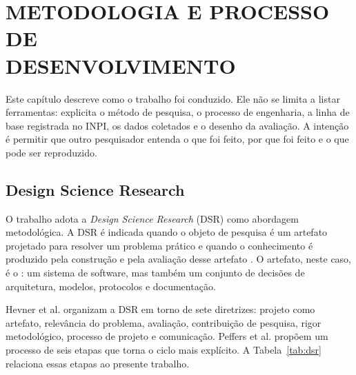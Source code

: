 
\chapter[METODOLOGIA E PROCESSO DE DESENVOLVIMENTO]{METODOLOGIA E PROCESSO DE\\DESENVOLVIMENTO}
\label{cap:metodologia}

Este capítulo descreve como o trabalho foi conduzido. Ele não se limita a
listar ferramentas: explicita o método de pesquisa, o processo de engenharia, a
linha de base registrada no INPI, os dados coletados e o desenho da avaliação.
A intenção é permitir que outro pesquisador entenda o que foi feito, por que foi
feito e o que pode ser reproduzido.

\section{Design Science Research}
\label{sec:dsr}

O trabalho adota a \textit{Design Science Research} (DSR) como abordagem
metodológica. A DSR é indicada quando o objeto de pesquisa é um artefato
projetado para resolver um problema prático e quando o conhecimento é produzido
pela construção e pela avaliação desse artefato \cite{hevner2004}. O artefato,
neste caso, é o \argus{}: um sistema de software, mas também um conjunto de
decisões de arquitetura, modelos, protocolos e documentação.

Hevner et al. \cite{hevner2004} organizam a DSR em torno de sete diretrizes:
projeto como artefato, relevância do problema, avaliação, contribuição de
pesquisa, rigor metodológico, processo de projeto e comunicação. Peffers et al.
\cite{peffers2007} propõem um processo de seis etapas que torna o ciclo mais
explícito. A Tabela~\ref{tab:dsr} relaciona essas etapas ao presente trabalho.

